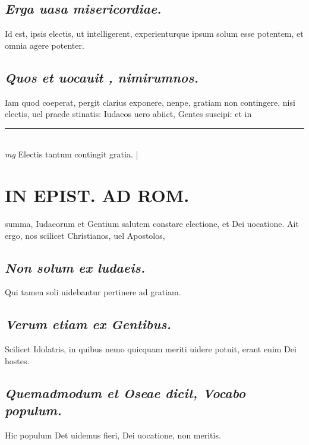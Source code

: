\documentclass{article}
\begin{document}
\begin{pages}
\subsection*{\textit{Erga uasa misericordiae. }}\pstart Id est, ipsis electis, ut intelligerent, experienturque  ipsum solum esse potentem, et omnia agere potenter.   \pend
{}
{}
\subsection*{\textit{Quos et uocauit , nimirumnos. }}\pstart Iam quod coeperat, pergit clarius exponere, nenpe, gratiam non contingere, nisi electis, uel praede stinatis: Iudaeos uero abiict, Gentes suscipi: et in  \pend
\vspace{0.5cm}\noindent
\vspace{0.2cm}\rule{1cm}{0.2pt}\\ 
\hspace{0.2cm}\textit{mg}
\footnotesize Electis tantum contingit gratia.  
\normalsize| 
\section*{IN EPIST. AD ROM.  }
\marginpar{[ p.114 ]}\pstart summa, Iudaeorum et Gentium salutem constare electione, et Dei uocatione. Ait ergo, nos scilicet Christianos, uel Apostolos,  \pend
{}
{}
\subsection*{\textit{Non solum ex ludaeis. }}\pstart Qui tamen soli uidebantur pertinere ad gratiam.  \pend
{}
{}
\subsection*{\textit{Verum etiam ex Gentibus. }}\pstart Scilicet Idolatris, in quibus nemo quicquam meriti uidere potuit, erant enim Dei hostes.   \pend
{}
{}
\subsection*{\textit{Quemadmodum et Oseae dicit, Vocabo populum. }}\pstart Hic populum Det uidemus fieri, Dei uocatione, non meritis.  \pend
{}
{}

\end{pages}
\end{document}
